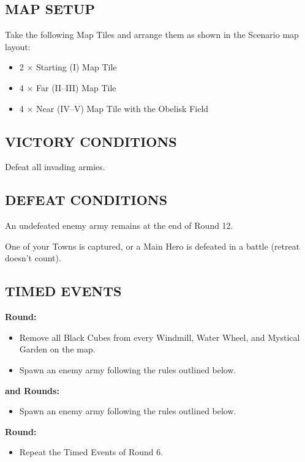 \begin{multicols}{2}
\subsection*{\MakeUppercase{Map Setup}}

Take the following Map Tiles and arrange them as shown in the Scenario map layout:

\begin{itemize}
  \item 2 × Starting (I) Map Tile
  \item 4 × Far (II--III) Map Tile
  \item 4 × Near (IV--V) Map Tile with the Obelisk Field
\end{itemize}

\subsection*{\MakeUppercase{Victory Conditions}}

Defeat all invading armies.

\subsection*{\MakeUppercase{Defeat Conditions}}

An undefeated enemy army remains at the end of Round 12.

One of your Towns is captured, or a Main Hero is defeated in a battle (retreat doesn't count).

\subsection*{\MakeUppercase{Timed Events}}

\textbf{ Round:}
\begin{itemize}
  \item Remove all Black Cubes from every Windmill, Water Wheel, and Mystical Garden on the map.
  \item Spawn an enemy army following the rules outlined below.
\end{itemize}

\textbf{ and  Rounds:}
\begin{itemize}
  \item Spawn an enemy army following the rules outlined below.
\end{itemize}

\textbf{ Round:}
\begin{itemize}
  \item Repeat the Timed Events of Round 6.
\end{itemize}


\end{multicols}
